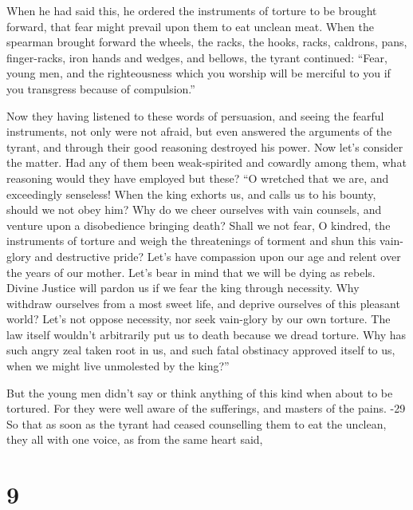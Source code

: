  When he had said this, he ordered the instruments of
torture to be brought forward, that fear might prevail upon them to eat
unclean meat.  When the spearman brought forward the
wheels, the racks, the hooks, racks, caldrons, pans, finger-racks, iron
hands and wedges, and bellows, the tyrant continued: 
``Fear, young men, and the righteousness which you worship will be
merciful to you if you transgress because of compulsion.''

 Now they having listened to these words of persuasion, and
seeing the fearful instruments, not only were not afraid, but even
answered the arguments of the tyrant, and through their good reasoning
destroyed his power.  Now let's consider the matter. Had
any of them been weak-spirited and cowardly among them, what reasoning
would they have employed but these?  ``O wretched that we
are, and exceedingly senseless! When the king exhorts us, and calls us
to his bounty, should we not obey him?  Why do we cheer
ourselves with vain counsels, and venture upon a disobedience bringing
death?  Shall we not fear, O kindred, the instruments of
torture and weigh the threatenings of torment and shun this vain-glory
and destructive pride?  Let's have compassion upon our age
and relent over the years of our mother.  Let's bear in
mind that we will be dying as rebels.  Divine Justice will
pardon us if we fear the king through necessity.  Why
withdraw ourselves from a most sweet life, and deprive ourselves of this
pleasant world?  Let's not oppose necessity, nor seek
vain-glory by our own torture.  The law itself wouldn't
arbitrarily put us to death because we dread torture.  Why
has such angry zeal taken root in us, and such fatal obstinacy approved
itself to us, when we might live unmolested by the king?''

 But the young men didn't say or think anything of this
kind when about to be tortured.  For they were well aware
of the sufferings, and masters of the pains. -29 So that as
soon as the tyrant had ceased counselling them to eat the unclean, they
all with one voice, as from the same heart said,

\hypertarget{section-8}{%
\section{9}\label{section-8}}

